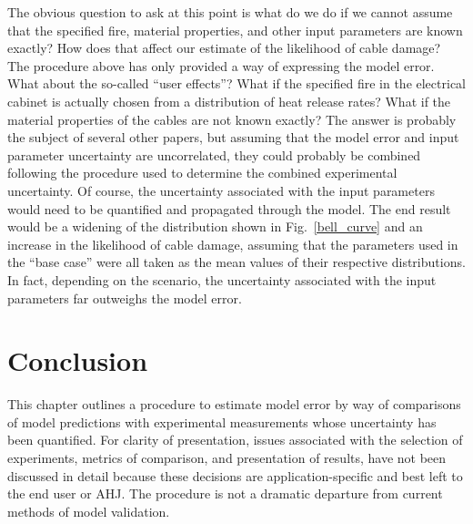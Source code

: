 The obvious question to ask at this point is what do we do if we cannot assume that the specified fire, material properties, and other input parameters are
known exactly? How does that affect our estimate of the likelihood of cable damage? The procedure above has only provided a way of expressing the model
error. What about the so-called ``user effects''? What if the specified fire in the electrical cabinet is actually chosen from a distribution of heat release rates?
What if the material properties of the cables are not known exactly? The answer is probably the subject of several other papers, but assuming that the model error
and input parameter uncertainty are uncorrelated, they could probably be combined following the procedure used to determine the combined experimental uncertainty. Of
course, the uncertainty associated with the input parameters would need to be quantified and propagated through the model. The end result would be a widening of
the distribution shown in Fig.~\ref{bell_curve} and an increase in the likelihood of cable damage, assuming that the parameters used in the ``base case'' were
all taken as the mean values of their respective distributions. In fact, depending on the scenario, the uncertainty associated with the input parameters far outweighs
the model error.


\section{Conclusion}

This chapter outlines a procedure to estimate model error by way of comparisons of model predictions with experimental measurements whose uncertainty has been
quantified. For clarity of presentation, issues associated with the selection of experiments, metrics of comparison, and presentation of results, have not been
discussed in detail because these decisions are application-specific and best left to the end user or AHJ. The procedure is not a dramatic departure from current
methods of model validation.
